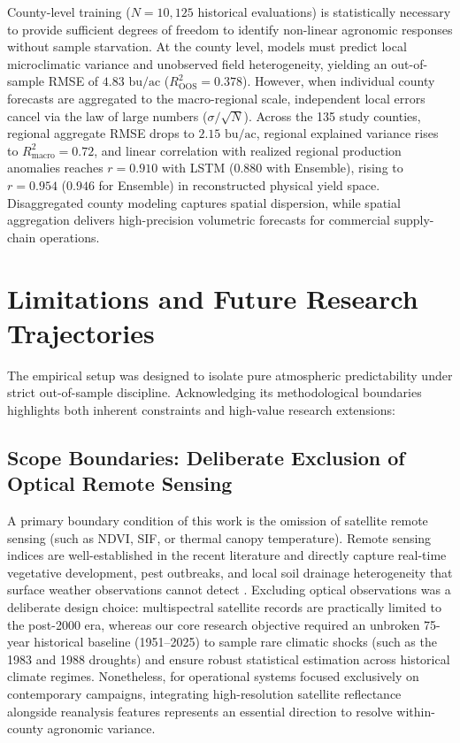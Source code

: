 County-level training ($N = 10{,}125$ historical evaluations) is statistically necessary to provide sufficient degrees of freedom to identify non-linear agronomic responses without sample starvation. At the county level, models must predict local microclimatic variance and unobserved field heterogeneity, yielding an out-of-sample RMSE of $4.83\text{ bu/ac}$ ($R^2_{\text{OOS}} = 0.378$). However, when individual county forecasts are aggregated to the macro-regional scale, independent local errors cancel via the law of large numbers ($\sigma / \sqrt{N}$). Across the 135 study counties, regional aggregate RMSE drops to $2.15\text{ bu/ac}$, regional explained variance rises to $R^2_{\text{macro}} = 0.72$, and linear correlation with realized regional production anomalies reaches $r = 0.910$ with LSTM ($0.880$ with Ensemble), rising to $r = 0.954$ ($0.946$ for Ensemble) in reconstructed physical yield space. Disaggregated county modeling captures spatial dispersion, while spatial aggregation delivers high-precision volumetric forecasts for commercial supply-chain operations.


\section{Limitations and Future Research Trajectories}
\label{sec:disc_limitations}

The empirical setup was designed to isolate pure atmospheric predictability under strict out-of-sample discipline. Acknowledging its methodological boundaries highlights both inherent constraints and high-value research extensions:

\subsection{Scope Boundaries: Deliberate Exclusion of Optical Remote Sensing}
A primary boundary condition of this work is the omission of satellite remote sensing (such as NDVI, SIF, or thermal canopy temperature). Remote sensing indices are well-established in the recent literature and directly capture real-time vegetative development, pest outbreaks, and local soil drainage heterogeneity that surface weather observations cannot detect \citep{Xie2025, Yinetal2026}. Excluding optical observations was a deliberate design choice: multispectral satellite records are practically limited to the post-2000 era, whereas our core research objective required an unbroken 75-year historical baseline (1951--2025) to sample rare climatic shocks (such as the 1983 and 1988 droughts) and ensure robust statistical estimation across historical climate regimes. Nonetheless, for operational systems focused exclusively on contemporary campaigns, integrating high-resolution satellite reflectance alongside reanalysis features represents an essential direction to resolve within-county agronomic variance.

